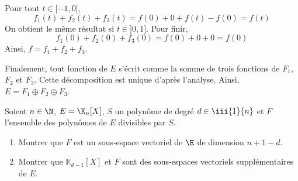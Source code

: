 \documentclass[a4paper,twoside,french,10pt]{VcCours}
\begin{document}
\medskip

Pour tout $t \in [-1,0[$,
$$ f_1(t)+f_2(t)+f_3(t) = f(0) + 0 + f(t)-f(0) = f(t)$$
On obtient le même résultat si $t \in ]0,1]$. Pour finir,
$$ f_1(0)+f_2(0)+f_3(0) = f(0) + 0 + 0 = f(0)$$
Ainsi, $f=f_1+f_2+f_3$.

\medskip

Finalement, tout fonction de $E$ s'écrit comme la somme de trois fonctions de $F_1$, $F_2$ et $F_3$. Cette décomposition est unique d'après l'analyse. Ainsi, $E = F_1 \oplus F_2 \oplus F_3$.

\medskip

\begin{Exercice}{} Soient $n\in\N$, $E=\K_n[X]$, $S$ un polynôme de degré $d \in \iii{1}{n}$ et $F$ l'ensemble des polynômes de $E$ divisibles par $S$.
\begin{enumerate}
	\item Montrer que $F$ est un sous-espace vectoriel de $\E$ de dimension $n+1-d$.
	\item Montrer que $\mathbb{K}_{d-1}[X]$  et $F$ sont des sous-espaces vectoriels supplémentaires de $E$.
\end{enumerate} 
\end{Exercice}
\end{document}
